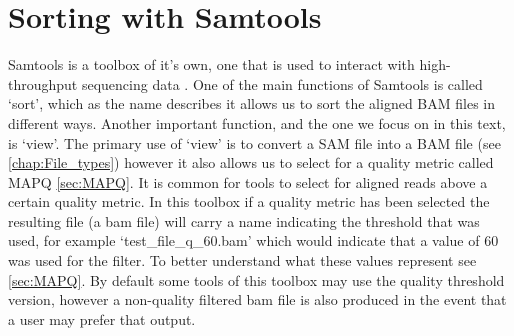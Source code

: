 \section{Sorting with Samtools \label{sec:samtools}}
Samtools is a toolbox of it's own, one that is used to interact with high-throughput sequencing data \cite{li2009sequence}. One of the main functions of Samtools is called `sort', which as the name describes it allows us to sort the aligned BAM files in different ways. Another important function, and the one we focus on in this text, is `view'. The primary use of `view' is to convert a SAM file into a BAM file (see \autoref{chap:File_types}) however it also allows us to select for a quality metric called MAPQ \autoref{sec:MAPQ}. It is common for tools to select for aligned reads above a certain quality metric. In this toolbox if a quality metric has been selected the resulting file (a bam file) will carry a name indicating the threshold that was used, for example `test\_file\_q\_60.bam' which would indicate that a value of 60 was used for the filter. To better understand what these values represent see \autoref{sec:MAPQ}. By default some tools of this toolbox may use the quality threshold version, however a non-quality filtered bam file is also produced in the event that a user may prefer that output.

